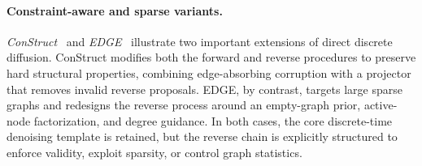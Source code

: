 \documentclass{article}
\begin{document}
\paragraph{Constraint-aware and sparse variants.}
\emph{ConStruct}~\cite{madeira2024generative} and \emph{EDGE}~\cite{chen2023efficient} illustrate two important extensions of direct discrete diffusion. ConStruct modifies both the forward and reverse procedures to preserve hard structural properties, combining edge-absorbing corruption with a projector that removes invalid reverse proposals. EDGE, by contrast, targets large sparse graphs and redesigns the reverse process around an empty-graph prior, active-node factorization, and degree guidance. In both cases, the core discrete-time denoising template is retained, but the reverse chain is explicitly structured to enforce validity, exploit sparsity, or control graph statistics.


\end{document}
